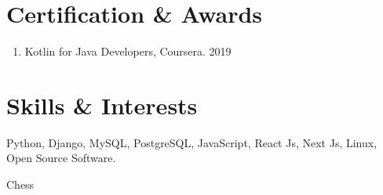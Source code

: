 \documentclass[11pt]{article} %
\begin{document}
\section{Certification \& Awards}
\begin{enumerate}[label=\null, left=0pt..0pt, itemsep=0pt]
        \item Kotlin for Java Developers, Coursera. \hfill 2019
\end{enumerate}

\section{Skills \& Interests}
\begin{description}[itemsep=0pt]
        \item[Technical] Python, Django, MySQL, PostgreSQL, JavaScript, React Js, Next Js, Linux, Open Source Software. 
        \item[Interests] Chess
\end{description}
\end{document}
